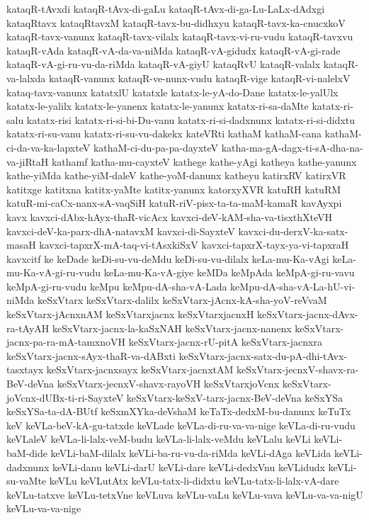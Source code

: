 {kataqR-tAvxdi
kataqR-tAvx-di-gaLu
kataqR-tAvx-di-ga-Lu-LaLx-dAdxgi
kataqRtavx
kataqRtavxM
kataqR-tavx-bu-didhxyu
kataqR-tavx-ka-cnucxkoV
kataqR-tavx-vanunx
kataqR-tavx-vilalx
kataqR-tavx-vi-ru-vudu
kataqR-tavxvu
kataqR-vAda
kataqR-vA-da-va-niMda
kataqR-vA-gidudx
kataqR-vA-gi-rade
kataqR-vA-gi-ru-vu-da-riMda
kataqR-vA-giyU
kataqRvU
kataqR-valalx
kataqR-va-lalxda
kataqR-vanunx
kataqR-ve-nunx-vudu
kataqR-vige
kataqR-vi-nalelxV
kataq-tavx-vanunx
katatxlU
katatxle
katatx-le-yA-do-Dane
katatx-le-yalUlx
katatx-le-yalilx
katatx-le-yanenx
katatx-le-yanunx
katatx-ri-sa-daMte
katatx-ri-salu
katatx-risi
katatx-ri-si-bi-Du-vanu
katatx-ri-si-dadxnunx
katatx-ri-si-didxtu
katatx-ri-su-vanu
katatx-ri-su-vu-dakekx
kateVRti
kathaM
kathaM-cana
kathaM-ci-da-va-ka-lapxteV
kathaM-ci-du-pa-pa-dayxteV
katha-ma-gA-dagx-ti-sA-dha-na-va-jiRtaH
kathamf
katha-mu-cayxteV
kathege
kathe-yAgi
katheya
kathe-yanunx
kathe-yiMda
kathe-yiM-daleV
kathe-yoM-danunx
katheyu
katirxRV
katirxVR
katitxge
katitxna
katitx-yaMte
katitx-yanunx
katorxyXVR
katuRH
katuRM
katuR-mi-caCx-nanx-sA-vaqSiH
katuR-riV-pisx-ta-ta-maM-kamaR
kavAyxpi
kavx
kavxci-dAbx-hAyx-thaR-vicAcx
kavxci-deV-kAM-sha-va-tisxthXteVH
kavxci-deV-ka-parx-dhA-natavxM
kavxci-di-SayxteV
kavxci-du-derxV-ka-satx-masaH
kavxci-tapxrX-mA-taq-vi-tAsxkiSxV
kavxci-tapxrX-tayx-ya-vi-tapxraH
kavxcitf
ke
keDade
keDi-su-vu-deMdu
keDi-su-vu-dilalx
keLa-mu-Ka-vAgi
keLa-mu-Ka-vA-gi-ru-vudu
keLa-mu-Ka-vA-giye
keMDa
keMpAda
keMpA-gi-ru-vavu
keMpA-gi-ru-vudu
keMpu
keMpu-dA-sha-vA-Lada
keMpu-dA-sha-vA-La-hU-vi-niMda
keSxVtarx
keSxVtarx-dalilx
keSxVtarx-jAcnx-kA-sha-yoV-reVvaM
keSxVtarx-jAcnxnAM
keSxVtarxjacnx
keSxVtarxjacnxH
keSxVtarx-jacnx-dAvx-ra-tAyAH
keSxVtarx-jacnx-la-kaSxNAH
keSxVtarx-jacnx-nanenx
keSxVtarx-jacnx-pa-ra-mA-tamxnoVH
keSxVtarx-jacnx-rU-pitA
keSxVtarx-jacnxra
keSxVtarx-jacnx-sAyx-thaR-va-dABxti
keSxVtarx-jacnx-satx-du-pA-dhi-tAvx-tasxtayx
keSxVtarx-jacnxsayx
keSxVtarx-jacnxtAM
keSxVtarx-jecnxV-shavx-ra-BeV-deVna
keSxVtarx-jecnxV-shavx-rayoVH
keSxVtarxjoVcnx
keSxVtarx-joVcnx-dUBx-ti-ri-SayxteV
keSxVtarx-keSxV-tarx-jacnx-BeV-deVna
keSxYSa
keSxYSa-ta-dA-BUtf
keSxmXYka-deVshaM
keTaTx-dedxM-bu-danunx
keTuTx
keV
keVLa-beV-kA-gu-tatxde
keVLade
keVLa-di-ru-va-va-nige
keVLa-di-ru-vudu
keVLaleV
keVLa-li-lalx-veM-budu
keVLa-li-lalx-veMdu
keVLalu
keVLi
keVLi-baM-dide
keVLi-baM-dilalx
keVLi-ba-ru-vu-da-riMda
keVLi-dAga
keVLida
keVLi-dadxnunx
keVLi-danu
keVLi-darU
keVLi-dare
keVLi-dedxVnu
keVLidudx
keVLi-su-vaMte
keVLu
keVLutAtx
keVLu-tatx-li-didxtu
keVLu-tatx-li-lalx-vA-dare
keVLu-tatxve
keVLu-tetxVne
keVLuva
keVLu-vaLu
keVLu-vava
keVLu-va-va-nigU
keVLu-va-va-nige
}
